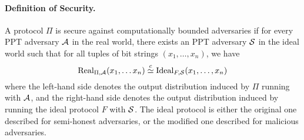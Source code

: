  



\paragraph{Definition of Security.} 
A protocol $\Pi$ is secure against computationally bounded adversaries if for every PPT adversary $\mathcal{A}$ in the real world, there exists an PPT adversary $\mathcal{S}$ in the ideal world such that for all tuples of bit strings $(x_1, \dotsc, x_n)$, we have
\[ \mathrm{Real}_{\Pi, \mathcal{A}}(x_1, \dotsc x_n) \stackrel{c}{\simeq} \mathrm{Ideal}_{F,\mathcal{S}}(x_1, \dotsc, x_n) \]
where the left-hand side denotes the output distribution induced by $\Pi$ running with $\mathcal{A}$, and the right-hand side denotes the output distribution induced by running the ideal protocol $F$ with $\mathcal{S}$. 
The ideal protocol is either the original one described for semi-honest adversaries, or the modified one described for malicious adversaries. 





%

